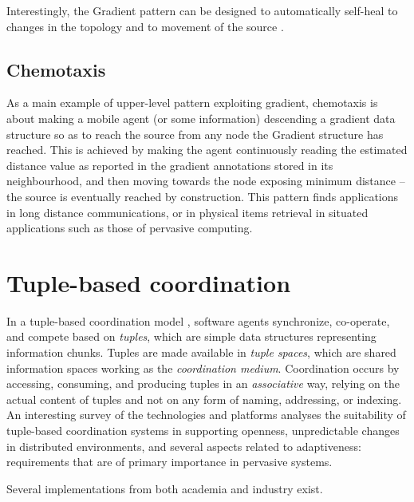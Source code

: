 \documentclass[12pt,a4paper,twoside,openright]{book}
\begin{document}
Interestingly, the Gradient pattern can be designed to automatically self-heal to changes in the topology and to movement of the source \cite{flexiblegradients}.
%
\cite{crf}

\subsection{Chemotaxis}

As a main example of upper-level pattern exploiting gradient, chemotaxis is about making a mobile agent (or some information) descending a gradient data structure so as to reach the source from any node the Gradient structure has reached.
%
This is achieved by making the agent continuously reading the estimated distance value as reported in the gradient annotations stored in its neighbourhood, and then moving towards the node exposing minimum distance -- the source is eventually reached by construction.
%
This pattern finds applications in long distance communications, or in physical items retrieval in situated applications such as those of pervasive computing.

\section{Tuple-based coordination}

In a tuple-based coordination model \cite{coordbook2001--ch04}, software agents synchronize, co-operate, and compete based on \emph{tuples}, which are simple data structures representing information chunks.
%
Tuples are made available in \emph{tuple spaces}, which are shared information spaces working as the \emph{coordination medium}.
%
Coordination occurs by accessing, consuming, and producing tuples in an \emph{associative} way, relying on the actual content of tuples and not on any form of naming, addressing, or indexing.
%
An interesting survey of the technologies and platforms \cite{adaptivenesslinda-esoaI} analyses the suitability of tuple-based coordination systems in supporting openness, unpredictable changes in distributed environments, and several aspects related to adaptiveness: requirements that are of primary importance in pervasive systems.

Several implementations from both academia and industry exist.
\end{document}
